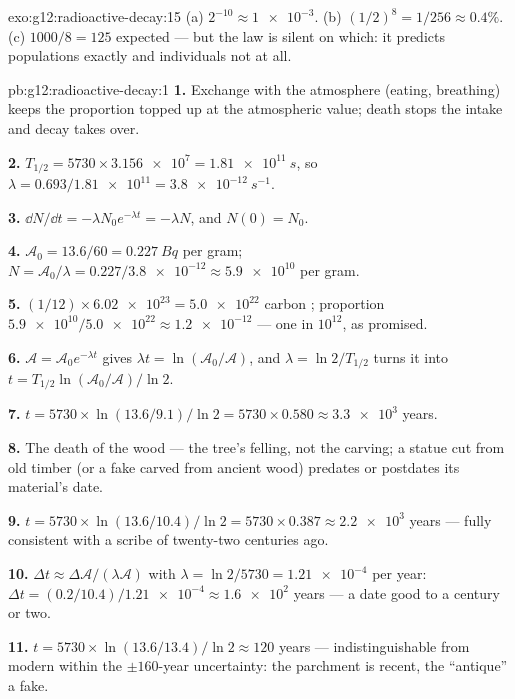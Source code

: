\begin{solution}{exo:g12:radioactive-decay:15}
(a) $2^{-10} \approx \num{1e-3}$. (b) $(1/2)^8 = 1/256 \approx
0.4\%$. (c) $1000/8 = 125$ expected --- but the law is silent on
which: it predicts populations exactly and individuals not at all.
\end{solution}

\begin{solution}{pb:g12:radioactive-decay:1}
\textbf{1.} Exchange with the atmosphere (eating, breathing) keeps
the proportion topped up at the atmospheric value; death stops the
intake and decay takes over.

\textbf{2.} $T_{1/2} = \num{5730} \times \num{3.156e7} =
\qty{1.81e11}{s}$, so $\lambda = 0.693/\num{1.81e11} =
\qty{3.8e-12}{s^{-1}}$.

\textbf{3.} $\dd N/\dd t = -\lambda N_0 e^{-\lambda t} = -\lambda N$,
and $N(0) = N_0$.

\textbf{4.} $\mathcal A_0 = 13.6/60 = \qty{0.227}{Bq}$ per gram;
$N = \mathcal A_0/\lambda = 0.227/\num{3.8e-12} \approx \num{5.9e10}$
 per gram.

\textbf{5.} $(1/12) \times \num{6.02e23} = \num{5.0e22}$ carbon
; proportion $\num{5.9e10}/\num{5.0e22} \approx \num{1.2e-12}$
--- one in $10^{12}$, as promised.

\textbf{6.} $\mathcal A = \mathcal A_0 e^{-\lambda t}$ gives
$\lambda t = \ln(\mathcal A_0/\mathcal A)$, and $\lambda =
\ln 2/T_{1/2}$ turns it into
$t = T_{1/2}\ln(\mathcal A_0/\mathcal A)/\ln 2$.

\textbf{7.} $t = \num{5730} \times \ln(13.6/9.1)/\ln 2 =
\num{5730} \times 0.580 \approx \num{3.3e3}$ years.

\textbf{8.} The death of the wood --- the tree's felling, not the
carving; a statue cut from old timber (or a fake carved from ancient
wood) predates or postdates its material's date.

\textbf{9.} $t = \num{5730} \times \ln(13.6/10.4)/\ln 2 =
\num{5730} \times 0.387 \approx \num{2.2e3}$ years --- fully
consistent with a scribe of twenty-two centuries ago.

\textbf{10.} $\Delta t \approx \Delta\mathcal A/(\lambda\mathcal A)$
with $\lambda = \ln 2/5730 = \num{1.21e-4}$ per year:
$\Delta t = (0.2/10.4)/\num{1.21e-4} \approx \num{1.6e2}$ years ---
a date good to a century or two.

\textbf{11.} $t = \num{5730} \times \ln(13.6/13.4)/\ln 2 \approx
120$ years --- indistinguishable from modern within the $\pm 160$-year
uncertainty: the parchment is recent, the ``antique'' a fake.


\end{solution}
